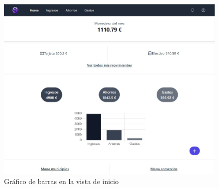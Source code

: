\begin{figure}[ht!]
    \centering
    \includegraphics[width=\linewidth]{imagenes/M3-home.jpg}
    \caption{Gráfico de barras en la vista de inicio}
    \label{fig:bar_chart}
\end{figure}

